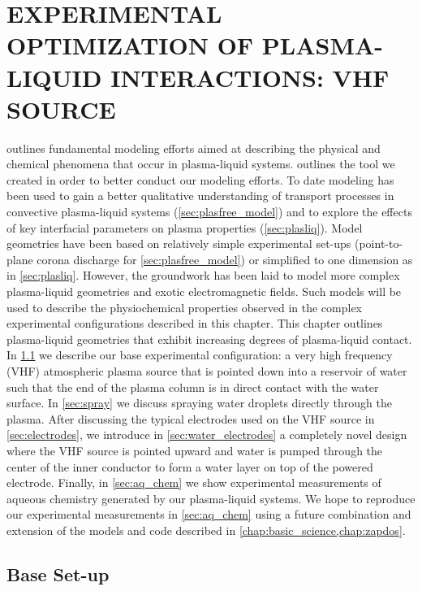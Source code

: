 \chapter{EXPERIMENTAL OPTIMIZATION OF PLASMA-LIQUID INTERACTIONS: VHF SOURCE}
\label{chap:expt_opt}

 outlines fundamental modeling efforts aimed at describing the physical and chemical phenomena that occur in plasma-liquid systems.  outlines the tool we created in order to better conduct our modeling efforts. To date modeling has been used to gain a better qualitative understanding of transport processes in convective plasma-liquid systems (\cref{sec:plasfree_model}) and to explore the effects of key interfacial parameters on plasma properties (\cref{sec:plasliq}). Model geometries have been based on relatively simple experimental set-ups (point-to-plane corona discharge for \cref{sec:plasfree_model}) or simplified to one dimension as in \cref{sec:plasliq}. However, the groundwork has been laid to model more complex plasma-liquid geometries and exotic electromagnetic fields. Such models will be used to describe the physiochemical properties observed in the complex experimental configurations described in this chapter. This chapter outlines plasma-liquid geometries that exhibit increasing degrees of plasma-liquid contact. In \cref{sec:base} we describe our base experimental configuration: a very high frequency (VHF) atmospheric plasma source that is pointed down into a reservoir of water such that the end of the plasma column is in direct contact with the water surface. In \cref{sec:spray} we discuss spraying water droplets directly through the plasma. After discussing the typical electrodes used on the VHF source in \cref{sec:electrodes}, we introduce in \cref{sec:water_electrodes} a completely novel design where the VHF source is pointed upward and water is pumped through the center of the inner conductor to form a water layer on top of the powered electrode. Finally, in \cref{sec:aq_chem} we show experimental measurements of aqueous chemistry generated by our plasma-liquid systems. We hope to reproduce our experimental measurements in \cref{sec:aq_chem} using a future combination and extension of the models and code described in \cref{chap:basic_science,chap:zapdos}.

\section{Base Set-up}
\label{sec:base}

